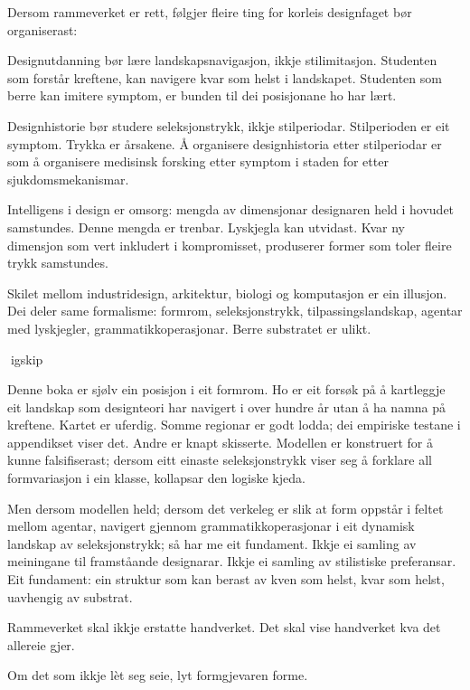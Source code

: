 Dersom rammeverket er rett, følgjer fleire ting for korleis designfaget bør organiserast:

Designutdanning bør lære landskapsnavigasjon, ikkje stilimitasjon. Studenten som forstår kreftene, kan navigere kvar som helst i landskapet. Studenten som berre kan imitere symptom, er bunden til dei posisjonane ho har lært.

Designhistorie bør studere seleksjonstrykk, ikkje stilperiodar. Stilperioden er eit symptom. Trykka er årsakene. Å organisere designhistoria etter stilperiodar er som å organisere medisinsk forsking etter symptom i staden for etter sjukdomsmekanismar.

Intelligens i design er omsorg: mengda av dimensjonar designaren held i hovudet samstundes. Denne mengda er trenbar. Lyskjegla kan utvidast. Kvar ny dimensjon som vert inkludert i kompromisset, produserer former som toler fleire trykk samstundes.

Skilet mellom industridesign, arkitektur, biologi og komputasjon er ein illusjon. Dei deler same formalisme: formrom, seleksjonstrykk, tilpassingslandskap, agentar med lyskjegler, grammatikkoperasjonar. Berre substratet er ulikt.

igskip

Denne boka er sjølv ein posisjon i eit formrom. Ho er eit forsøk på å kartleggje eit landskap som designteori har navigert i over hundre år utan å ha namna på kreftene. Kartet er uferdig. Somme regionar er godt lodda; dei empiriske testane i appendikset viser det. Andre er knapt skisserte. Modellen er konstruert for å kunne falsifiserast; dersom eitt einaste seleksjonstrykk viser seg å forklare all formvariasjon i ein klasse, kollapsar den logiske kjeda.

Men dersom modellen held; dersom det verkeleg er slik at form oppstår i feltet mellom agentar, navigert gjennom grammatikkoperasjonar i eit dynamisk landskap av seleksjonstrykk; så har me eit fundament. Ikkje ei samling av meiningane til framståande designarar. Ikkje ei samling av stilistiske preferansar. Eit fundament: ein struktur som kan berast av kven som helst, kvar som helst, uavhengig av substrat.

Rammeverket skal ikkje erstatte handverket. Det skal vise handverket kva det allereie gjer.

Om det som ikkje lèt seg seie, lyt formgjevaren forme.
